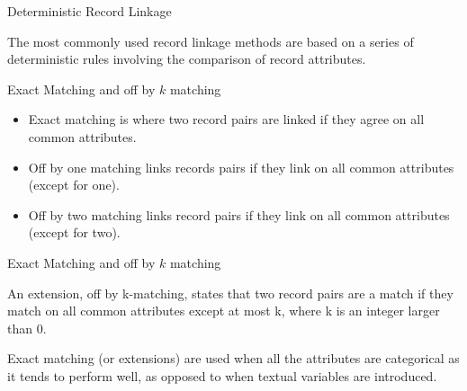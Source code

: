 \documentclass[
  ignorenonframetext,
]{beamer}
\providecommand{\tightlist}{%
  \setlength{\itemsep}{0pt}\setlength{\parskip}{0pt}}
\begin{document}
\begin{frame}{Deterministic Record Linkage}
\protect\hypertarget{deterministic-record-linkage}{}

The most commonly used record linkage methods are based on a series of
deterministic rules involving the comparison of record attributes.

\end{frame}

\begin{frame}{Exact Matching and off by \(k\) matching}
\protect\hypertarget{exact-matching-and-off-by-k-matching}{}

\begin{itemize}
\tightlist
\item
  Exact matching is where two record pairs are linked if they agree on
  all common attributes.
\end{itemize}

\pause

\begin{itemize}
\tightlist
\item
  Off by one matching links records pairs if they link on all common
  attributes (except for one).
\end{itemize}

\pause

\begin{itemize}
\tightlist
\item
  Off by two matching links record pairs if they link on all common
  attributes (except for two).
\end{itemize}

\pause

\end{frame}

\begin{frame}{Exact Matching and off by \(k\) matching}
\protect\hypertarget{exact-matching-and-off-by-k-matching-1}{}

An extension, off by k-matching, states that two record pairs are a
match if they match on all common attributes except at most k, where k
is an integer larger than 0.

\vspace*{2em}

\pause

Exact matching (or extensions) are used when all the attributes are
categorical as it tends to perform well, as opposed to when textual
variables are introduced.

\end{frame}
\end{document}
